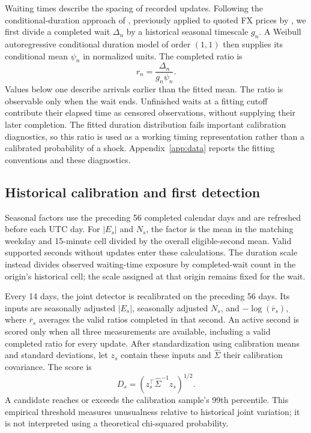\documentclass[12pt,letterpaper]{article}
\begin{document}
Waiting times describe the spacing of recorded updates. Following the conditional-duration approach of \citet{engle1998duration}, previously applied to quoted FX prices by \citet{engle1997forecasting}, we first divide a completed wait $\Delta_n$ by a historical seasonal timescale $g_n$. A Weibull autoregressive conditional duration model of order $(1,1)$ then supplies its conditional mean $\psi_n$ in normalized units. The completed ratio is
\begin{equation}
r_n=\frac{\Delta_n}{g_n\psi_n}.\label{eq:duration}
\end{equation}
Values below one describe arrivals earlier than the fitted mean. The ratio is observable only when the wait ends. Unfinished waits at a fitting cutoff contribute their elapsed time as censored observations, without supplying their later completion. The fitted duration distribution fails important calibration diagnostics, so this ratio is used as a working timing representation rather than a calibrated probability of a shock. Appendix~\ref{app:data} reports the fitting conventions and these diagnostics.

\subsection{Historical calibration and first detection}
Seasonal factors use the preceding 56 completed calendar days and are refreshed before each UTC day. For $|E_s|$ and $N_s$, the factor is the mean in the matching weekday and 15-minute cell divided by the overall eligible-second mean. Valid supported seconds without updates enter these calculations. The duration scale instead divides observed waiting-time exposure by completed-wait count in the origin's historical cell; the scale assigned at that origin remains fixed for the wait.

Every 14 days, the joint detector is recalibrated on the preceding 56 days. Its inputs are seasonally adjusted $|E_s|$, seasonally adjusted $N_s$, and $-\log(\overline r_s)$, where $\overline r_s$ averages the valid ratios completed in that second. An active second is scored only when all three measurements are available, including a valid completed ratio for every update. After standardization using calibration means and standard deviations, let $z_s$ contain these inputs and $\widehat\Sigma$ their calibration covariance. The score is
\begin{equation}
D_s=(z_s^\top\widehat\Sigma^{-1}z_s)^{1/2}.
\end{equation}
A candidate reaches or exceeds the calibration sample's 99th percentile. This empirical threshold measures unusualness relative to historical joint variation; it is not interpreted using a theoretical chi-squared probability.
\end{document}
